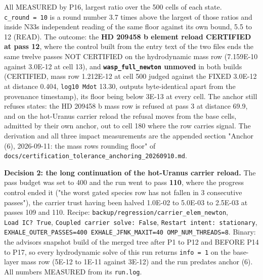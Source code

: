 \documentclass[english,a4paper]{my_memo}
\begin{document}
All MEASURED by P16, largest ratio over the 500 cells of each state. \texttt{c\_round\ =\ 10} is a round number 3.7 times above the largest of those ratios and inside
N33\textquotesingle s independent reading of the same floor against its own bound, 5.5 to 12
(READ). The outcome: the \textbf{HD 209458 b element reload CERTIFIED at pass 12},
where the control built from the entry text of the two files ends the same
twelve passes NOT CERTIFIED on the hydrodynamic mass row (7.159E-10 against
3.0E-12 at cell 13), and \textbf{\texttt{wasp\_full\_newton} unmoved} in both builds
(CERTIFIED, mass row 1.212E-12 at cell 500 judged against the FIXED 3.0E-12 at
distance 0.404, \texttt{log10\ Mdot} 13.30, outputs byte-identical apart from the
provenance timestamp), its floor being below 3E-13 at every cell. The anchor
still refuses states: the HD 209458 b mass row is refused at pass 3 at distance
69.9, and on the hot-Uranus carrier reload the refusal moves from the base
cells, admitted by their own anchor, out to cell 180 where the row carries
signal. The derivation and all three impact measurements are the appended
section "Anchor (6), 2026-09-11: the mass row\textquotesingle s rounding floor" of
\texttt{docs/certification\_tolerance\_anchoring\_20260910.md}.

\textbf{Decision 2: the long continuation of the hot-Uranus carrier reload.} The
pass budget was set to 400 and the run went to pass \textbf{110}, where the progress
control ended it ("the worst gated species row has not fallen in 3 consecutive
passes"), the carrier trust having been halved 1.0E-02 to 5.0E-03 to 2.5E-03 at
passes 109 and 110. Recipe: \texttt{backup/regression/carrier\_elem\_newton},
\texttt{Load\ IC?\ True}, \texttt{Coupled\ carrier\ solve:\ False}, \texttt{Restart\ intent:\ stationary},
\texttt{EXHALE\_OUTER\_PASSES=400\ EXHALE\_JFNK\_MAXIT=40\ OMP\_NUM\_THREADS=8}. Binary: the
advisor\textquotesingle s snapshot build of the merged tree after P1 to P12 and BEFORE P14 to
P17, so every hydrodynamic solve of this run returns \texttt{info\ =\ 1} on the
base-layer mass row (5E-12 to 1E-11 against 3E-12) and the run predates
anchor (6). All numbers MEASURED from its \texttt{run.log}.
\end{document}
